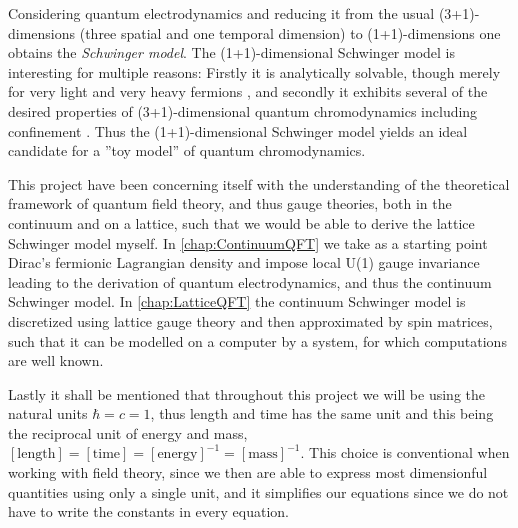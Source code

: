 \documentclass[../main.tex]{subfiles} %
\begin{document}
Considering quantum electrodynamics and reducing it from the usual (3+1)-dimensions (three spatial and one temporal dimension) to (1+1)-dimensions one obtains the \emph{Schwinger model}. The (1+1)-dimensional Schwinger model is interesting for multiple reasons: Firstly it is analytically solvable, though merely for very light and very heavy fermions \cite{crewther_eigenvalueForSchwingerModel_1980}, and secondly it exhibits several of the desired properties of (3+1)-dimensional quantum chromodynamics including confinement \cite{hamer_massiveSchwingerModelOnLattice_1982}. Thus the (1+1)-dimensional Schwinger model yields an ideal candidate for a ''toy model'' of quantum chromodynamics.

This project have been concerning itself with the understanding of the theoretical framework of quantum field theory, and thus gauge theories, both in the continuum and on a lattice, such that we would be able to derive the lattice Schwinger model myself. In \cref{chap:ContinuumQFT} we take as a starting point Dirac's fermionic Lagrangian density and impose local U(1) gauge invariance leading to the derivation of quantum electrodynamics, and thus the continuum Schwinger model. In \cref{chap:LatticeQFT} the continuum Schwinger model is discretized using lattice gauge theory and then approximated by spin matrices, such that it can be modelled on a computer by a system, for which computations are well known. %

Lastly it shall be mentioned that throughout this project we will be using the natural units $\hbar = c = 1$, thus length and time has the same unit and this being the reciprocal unit of energy and mass, $[\mathrm{length}] = [\mathrm{time}] = [\mathrm{energy}]^{-1} = [\mathrm{mass}]^{-1}$. This choice is conventional when working with field theory, since we then are able to express most dimensionful quantities using only a single unit, and it simplifies our equations since we do not have to write the constants in every equation.
\end{document}
